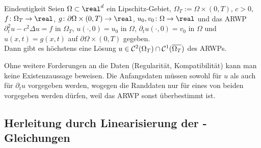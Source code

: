 \begin{Satz}{Eindeutigkeit}
    Seien $\Omega \subset \real^d$ ein Lipschitz-Gebiet, $\Omega_T := \Omega \times (0, T)$,
    $c > 0$, $f\colon \Omega_T \to \real$, $g\colon \partial\Omega \times (0, T) \to \real$,
    $u_0, v_0\colon \Omega \to \real$ und das ARWP
    $\partial_t^2 u - c^2 \Delta u = f$ in $\Omega_T$,
    $u(\cdot, 0) = u_0$ in $\Omega$,
    $\partial_t u(\cdot, 0) = v_0$ in $\Omega$ und
    $u(x, t) = g(x, t)$ auf $\partial\Omega \times (0, T)$ gegeben.\\
    Dann gibt es höchstens eine Lösung $u \in \mathcal{C}^2(\Omega_T) \cap \mathcal{C}^1(\overline{\Omega_T})$
    des ARWPs.
\end{Satz}

\begin{Bem}
    Ohne weitere Forderungen an die Daten (Regularität, Kompatibilität) kann man keine
    Existenzaussage beweisen.
    Die Anfangsdaten müssen sowohl für $u$ als auch für $\partial_t u$ vorgegeben werden,
    wogegen die Randdaten nur für eines von beiden vorgegeben werden dürfen,
    weil das ARWP sonst überbestimmt ist.
\end{Bem}

\pagebreak

\subsection{%
    Herleitung durch Linearisierung der -Gleichungen%
}

